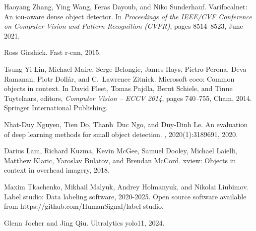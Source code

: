 \documentclass{article}
\begin{document}
\begin{thebibliography}{10}
Haoyang Zhang, Ying Wang, Feras Dayoub, and Niko Sunderhauf.
\newblock Varifocalnet: An iou-aware dense object detector.
\newblock In {\em Proceedings of the IEEE/CVF Conference on Computer Vision and Pattern Recognition (CVPR)}, pages 8514--8523, June 2021.

Ross Girshick.
\newblock Fast r-cnn, 2015.

Tsung-Yi Lin, Michael Maire, Serge Belongie, James Hays, Pietro Perona, Deva Ramanan, Piotr Doll{\'a}r, and C.~Lawrence Zitnick.
\newblock Microsoft coco: Common objects in context.
\newblock In David Fleet, Tomas Pajdla, Bernt Schiele, and Tinne Tuytelaars, editors, {\em Computer Vision -- ECCV 2014}, pages 740--755, Cham, 2014. Springer International Publishing.

Nhat-Duy Nguyen, Tien Do, Thanh~Duc Ngo, and Duy-Dinh Le.
\newblock An evaluation of deep learning methods for small object detection.
, 2020(1):3189691, 2020.

Darius Lam, Richard Kuzma, Kevin McGee, Samuel Dooley, Michael Laielli, Matthew Klaric, Yaroslav Bulatov, and Brendan McCord.
\newblock xview: Objects in context in overhead imagery, 2018.

Maxim Tkachenko, Mikhail Malyuk, Andrey Holmanyuk, and Nikolai Liubimov.
\newblock Label studio: Data labeling software, 2020-2025.
\newblock Open source software available from https://github.com/HumanSignal/label-studio.

Glenn Jocher and Jing Qiu.
\newblock Ultralytics yolo11, 2024.

\end{thebibliography}
\end{document}
